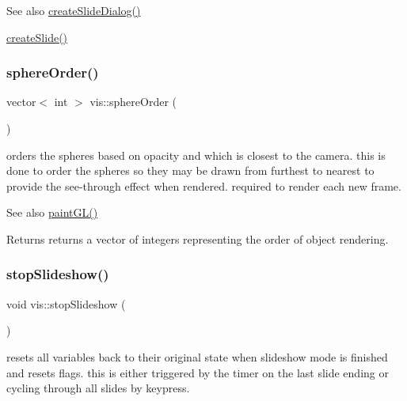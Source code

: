 \begin{DoxySeeAlso}{See also}
\mbox{\hyperlink{classvis_a09be90ab62dec1dcf2a72690d254acfb}{create\+Slide\+Dialog()}} 

\mbox{\hyperlink{classvis_a131dcf83ee61359b99624ea2538898a4}{create\+Slide()}} 
\end{DoxySeeAlso}
\mbox{\label{classvis_a250353e36f42fd058d6b59692356d29a}} 
\subsubsection{\texorpdfstring{sphere\+Order()}{sphereOrder()}}
{\footnotesize\ttfamily vector$<$ int $>$ vis\+::sphere\+Order (\begin{DoxyParamCaption}{ }\end{DoxyParamCaption})}

orders the spheres based on opacity and which is closest to the camera. this is done to order the spheres so they may be drawn from furthest to nearest to provide the see-\/through effect when rendered. required to render each new frame.

\begin{DoxySeeAlso}{See also}
\mbox{\hyperlink{classvis_ace835462bb98cad495e829c08e1a26ea}{paint\+G\+L()}} 
\end{DoxySeeAlso}
\begin{DoxyReturn}{Returns}
returns a vector of integers representing the order of object rendering. 
\end{DoxyReturn}
\mbox{\label{classvis_a74dfdd319ae733d8ff96aa60bccd65b7}} 
\subsubsection{\texorpdfstring{stop\+Slideshow()}{stopSlideshow()}}
{\footnotesize\ttfamily void vis\+::stop\+Slideshow (\begin{DoxyParamCaption}{ }\end{DoxyParamCaption})}

resets all variables back to their original state when slideshow mode is finished and resets flags. this is either triggered by the timer on the last slide ending or cycling through all slides by keypress.

